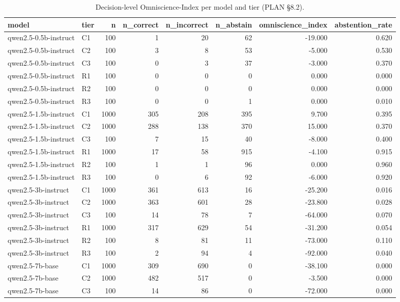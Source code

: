 \begin{table}
\caption{Decision-level Omniscience-Index per model and tier (PLAN §8.2).}
\label{tab:t10_omniscience_index}
\begin{tabular}{llrrrrrr}
\toprule
model & tier & n & n\_correct & n\_incorrect & n\_abstain & omniscience\_index & abstention\_rate \\
\midrule
qwen2.5-0.5b-instruct & C1 & 100 & 1 & 20 & 62 & -19.000 & 0.620 \\
qwen2.5-0.5b-instruct & C2 & 100 & 3 & 8 & 53 & -5.000 & 0.530 \\
qwen2.5-0.5b-instruct & C3 & 100 & 0 & 3 & 37 & -3.000 & 0.370 \\
qwen2.5-0.5b-instruct & R1 & 100 & 0 & 0 & 0 & 0.000 & 0.000 \\
qwen2.5-0.5b-instruct & R2 & 100 & 0 & 0 & 0 & 0.000 & 0.000 \\
qwen2.5-0.5b-instruct & R3 & 100 & 0 & 0 & 1 & 0.000 & 0.010 \\
qwen2.5-1.5b-instruct & C1 & 1000 & 305 & 208 & 395 & 9.700 & 0.395 \\
qwen2.5-1.5b-instruct & C2 & 1000 & 288 & 138 & 370 & 15.000 & 0.370 \\
qwen2.5-1.5b-instruct & C3 & 100 & 7 & 15 & 40 & -8.000 & 0.400 \\
qwen2.5-1.5b-instruct & R1 & 1000 & 17 & 58 & 915 & -4.100 & 0.915 \\
qwen2.5-1.5b-instruct & R2 & 100 & 1 & 1 & 96 & 0.000 & 0.960 \\
qwen2.5-1.5b-instruct & R3 & 100 & 0 & 6 & 92 & -6.000 & 0.920 \\
qwen2.5-3b-instruct & C1 & 1000 & 361 & 613 & 16 & -25.200 & 0.016 \\
qwen2.5-3b-instruct & C2 & 1000 & 363 & 601 & 28 & -23.800 & 0.028 \\
qwen2.5-3b-instruct & C3 & 100 & 14 & 78 & 7 & -64.000 & 0.070 \\
qwen2.5-3b-instruct & R1 & 1000 & 317 & 629 & 54 & -31.200 & 0.054 \\
qwen2.5-3b-instruct & R2 & 100 & 8 & 81 & 11 & -73.000 & 0.110 \\
qwen2.5-3b-instruct & R3 & 100 & 2 & 94 & 4 & -92.000 & 0.040 \\
qwen2.5-7b-base & C1 & 1000 & 309 & 690 & 0 & -38.100 & 0.000 \\
qwen2.5-7b-base & C2 & 1000 & 482 & 517 & 0 & -3.500 & 0.000 \\
qwen2.5-7b-base & C3 & 100 & 14 & 86 & 0 & -72.000 & 0.000 \\

\end{tabular}
\end{table}
